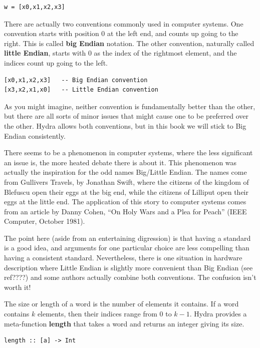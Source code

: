 \documentclass[]{svmono}
\begin{document}
\begin{verbatim}
w = [x0,x1,x2,x3]
\end{verbatim}


There are actually two conventions commonly used in computer systems.
One convention starts with position 0 at the left end, and counts up
going to the right.  This is called \textbf{big Endian} notation.  The
other convention, naturally called \textbf{little Endian}, starts with 0
as the index of the rightmost element, and the indices count up going
to the left.

\begin{verbatim}
[x0,x1,x2,x3]   -- Big Endian convention
[x3,x2,x1,x0]   -- Little Endian convention
\end{verbatim}


As you might imagine, neither convention is fundamentally better than
the other, but there are all sorts of minor issues that might cause
one to be preferred over the other.  Hydra allows both conventions,
but in this book we will stick to Big Endian consistently.

There seems to be a phenomenon in computer systems, where the less
significant an issue is, the more heated debate there is about it.
This phenomenon was actually the inspiration for the odd names
Big/Little Endian.  The names come from Gullivers Travels, by Jonathan
Swift, where the citizens of the kingdom of Blefuscu open their eggs
at the big end, while the citizens of Lilliput open their eggs at the
little end.  The application of this story to computer systems comes
from an article by Danny Cohen, ``On Holy Wars and a Plea for Peach''
(IEEE Computer, October 1981).

The point here (aside from an entertaining digression) is that having
a standard is a good idea, and arguments for one particular choice are
less compelling than having a consistent standard.  Nevertheless,
there is one situation in hardware description where Little Endian is
slightly more convenient than Big Endian (see ref????) and some
authors actually combine both conventions.  The confusion isn't worth
it!

The size or length of a word is the number of elements it contains.
If a word contains \(k\) elements, then their indices range from 0 to
\(k-1\).  Hydra provides a meta-function \textbf{length} that takes a word and
returns an integer giving its size.


\begin{verbatim}
length :: [a] -> Int
\end{verbatim}
\end{document}
